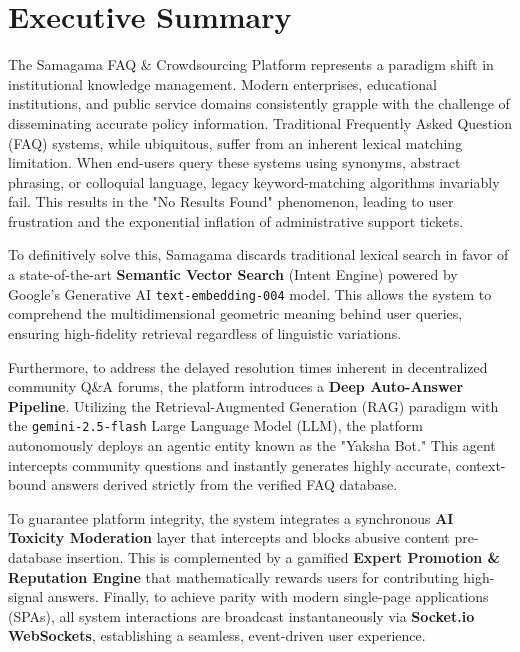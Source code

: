 \documentclass[12pt,a4paper]{article}
\begin{document}
\newpage
{}
\tableofcontents
\newpage


\section{Executive Summary}
\vspace{0.5cm}

The Samagama FAQ \& Crowdsourcing Platform represents a paradigm shift in institutional knowledge management. Modern enterprises, educational institutions, and public service domains consistently grapple with the challenge of disseminating accurate policy information. Traditional Frequently Asked Question (FAQ) systems, while ubiquitous, suffer from an inherent lexical matching limitation. When end-users query these systems using synonyms, abstract phrasing, or colloquial language, legacy keyword-matching algorithms invariably fail. This results in the "No Results Found" phenomenon, leading to user frustration and the exponential inflation of administrative support tickets.

To definitively solve this, Samagama discards traditional lexical search in favor of a state-of-the-art \textbf{Semantic Vector Search} (Intent Engine) powered by Google's Generative AI \texttt{text-embedding-004} model. This allows the system to comprehend the multidimensional geometric meaning behind user queries, ensuring high-fidelity retrieval regardless of linguistic variations. 

Furthermore, to address the delayed resolution times inherent in decentralized community Q\&A forums, the platform introduces a \textbf{Deep Auto-Answer Pipeline}. Utilizing the Retrieval-Augmented Generation (RAG) paradigm with the \texttt{gemini-2.5-flash} Large Language Model (LLM), the platform autonomously deploys an agentic entity known as the "Yaksha Bot." This agent intercepts community questions and instantly generates highly accurate, context-bound answers derived strictly from the verified FAQ database.

To guarantee platform integrity, the system integrates a synchronous \textbf{AI Toxicity Moderation} layer that intercepts and blocks abusive content pre-database insertion. This is complemented by a gamified \textbf{Expert Promotion \& Reputation Engine} that mathematically rewards users for contributing high-signal answers. Finally, to achieve parity with modern single-page applications (SPAs), all system interactions are broadcast instantaneously via \textbf{Socket.io WebSockets}, establishing a seamless, event-driven user experience.
\end{document}
